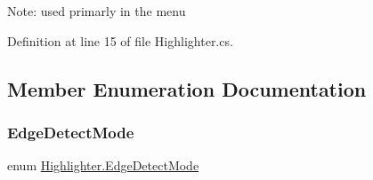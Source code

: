 Note\+: used primarly in the menu 

Definition at line 15 of file Highlighter.\+cs.



\subsection{Member Enumeration Documentation}
\mbox{\label{class_highlighter_a585a556fee5d14c362fbf2fada52a073}} 
\subsubsection{\texorpdfstring{Edge\+Detect\+Mode}{EdgeDetectMode}}
{\footnotesize\ttfamily enum \mbox{\hyperlink{class_highlighter_a585a556fee5d14c362fbf2fada52a073}{Highlighter.\+Edge\+Detect\+Mode}}\hspace{0.3cm}{\ttfamily [strong]}}

